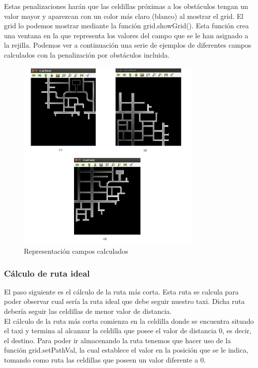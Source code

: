 Estas penalizaciones harán que las celdillas próximas a los obstáculos tengan un valor mayor y aparezcan con un color más claro (blanco) al mostrar el grid. El grid lo podemos mostrar mediante la función grid.showGrid(). Esta función crea una ventana en la que representa los valores del campo que se le han asignado a la rejilla. Podemos ver a continuación una serie de ejemplos de diferentes campos calculados con la penalización por obstáculos incluida.\\

\begin{figure}[H]
  \begin{center}
    \includegraphics[width=0.8\textwidth]{figures/GPP/campos.png}
		\caption{Representación campos calculados}
		\label{fig.campos_gpp}
		\end{center}
\end{figure}

\subsubsection{Cálculo de ruta ideal}
El paso siguiente es el cálculo de la ruta más corta. Esta ruta se calcula para poder observar cual sería la ruta ideal que debe seguir nuestro taxi. Dicha ruta debería seguir las celdillas de menor valor de distancia.\\


El cálculo de la ruta más corta comienza en la celdilla donde se encuentra situado el taxi y termina al alcanzar la celdilla que posee el valor de distancia 0, es decir, el destino. Para poder ir almacenando la ruta tenemos que hacer uso de la función grid.setPathVal, la cual establece el valor en la posición que se le indica, tomando como ruta las celdillas que poseen un valor diferente a 0. \\


